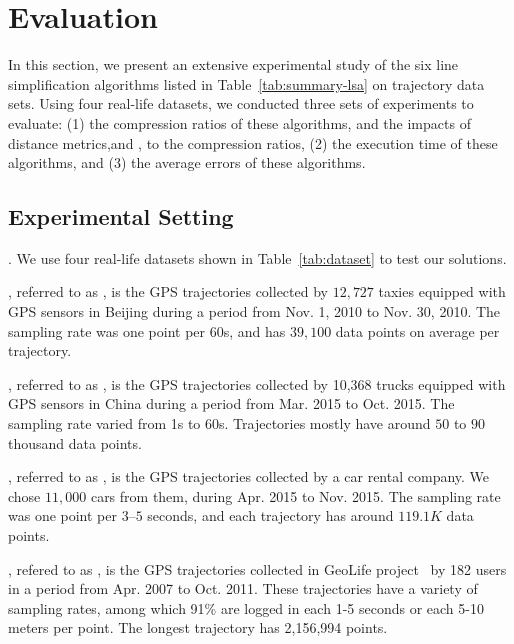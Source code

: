 \section{Evaluation} %
\label{sec-exp}
In this section, we present an extensive experimental study of the six line simplification algorithms listed in Table~\ref{tab:summary-lsa} on trajectory data sets.
Using four real-life datasets, we conducted three sets of experiments to evaluate:
(1) the compression ratios of these algorithms, and the impacts of distance metrics,\ie \sed and \ped, to the compression ratios, 
(2) the execution time of these algorithms, and
(3) the average errors of these algorithms.



\subsection{Experimental Setting}

.
We use four real-life datasets shown in Table~\ref{tab:dataset} to test our solutions.

, referred to as \taxi, is the GPS trajectories collected by $12,727$ taxies equipped with GPS sensors in Beijing during a period
from Nov. 1, 2010 to Nov. 30, 2010. The sampling rate was one point  per 60s, and \taxi has $39,100$ data points on average per trajectory.

, referred to as \truck, is the GPS trajectories collected by 10,368 trucks equipped with GPS sensors in China
during a period from Mar. 2015 to Oct. 2015. The sampling rate varied from 1s to 60s. Trajectories mostly have around $50$ to $90$ thousand data points.

, referred to as \sercar,  is the GPS trajectories collected by a car rental company.
We chose $11,000$ cars from them, during Apr. 2015 to Nov. 2015. The sampling rate was one point per $3$--$5$ seconds, and
each trajectory has around $119.1K$ data points.

{, refered to as \geolife, is the GPS trajectories collected in GeoLife project~\cite{Zheng:GeoLife} by 182 users in a period from Apr. 2007 to Oct. 2011. These trajectories have a variety of sampling rates, among which 91\% are logged in each 1-5 seconds or each 5-10 meters per point. The longest trajectory has 2,156,994 points.}

